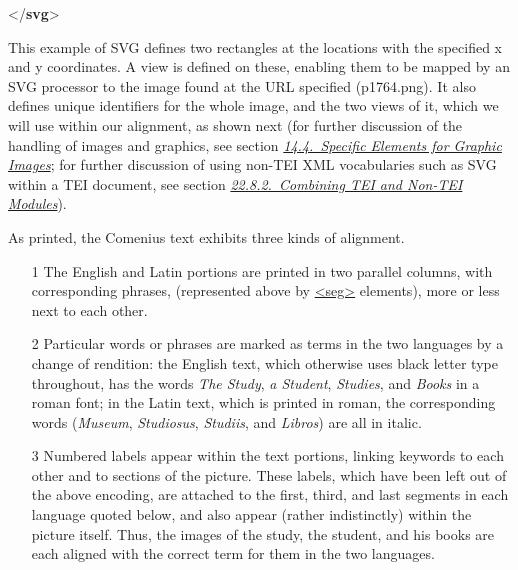 \begin{shaded}
{</\textbf{svg}>}\end{shaded}\egroup\par \noindent  This example of SVG defines two rectangles at the locations with the specified x and y coordinates. A view is defined on these, enabling them to be mapped by an SVG processor to the image found at the URL specified (\textsf{p1764.png}). It also defines unique identifiers for the whole image, and the two views of it, which we will use within our alignment, as shown next (for further discussion of the handling of images and graphics, see section \textit{\hyperref[FTGRA]{14.4.\ Specific Elements for Graphic Images}}; for further discussion of using non-TEI XML vocabularies such as SVG within a TEI document, see section \textit{\hyperref[ST-aliens]{22.8.2.\ Combining TEI and Non-TEI Modules}}).\par
As printed, the Comenius text exhibits three kinds of alignment. \begin{enumerate}
\item[1] The English and Latin portions are printed in two parallel columns, with corresponding phrases, (represented above by \hyperref[TEI.seg]{<seg>} elements), more or less next to each other.
\item[2] Particular words or phrases are marked as terms in the two languages by a change of rendition: the English text, which otherwise uses black letter type throughout, has the words \textit{The Study}, \textit{a Student}, \textit{Studies}, and \textit{Books} in a roman font; in the Latin text, which is printed in roman, the corresponding words (\textit{Museum}, \textit{Studiosus}, \textit{Studiis}, and \textit{Libros}) are all in italic.
\item[3] Numbered labels appear within the text portions, linking keywords to each other and to sections of the picture. These labels, which have been left out of the above encoding, are attached to the first, third, and last segments in each language quoted below, and also appear (rather indistinctly) within the picture itself. Thus, the images of the study, the student, and his books are each aligned with the correct term for them in the two languages.
\end{enumerate}\par
